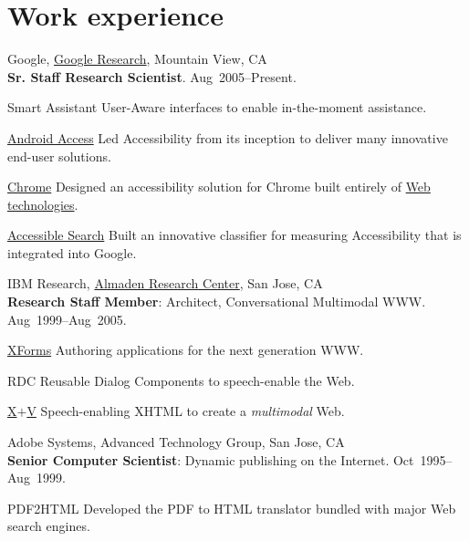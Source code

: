 \documentclass{article}
\begin{document}
\section*{Work experience}
\begin{compactitem}
  \item {Google},
  \href{http://www.google.com/search?q=\%22tv+raman\%22}{Google Research}, Mountain View, CA\\
  \textbf{Sr. Staff Research Scientist}.
\hfill Aug~2005--Present.
\begin{compactdesc}
  \item [Smart Assistant] User-Aware interfaces to enable
in-the-moment  assistance.
\item[\href{http://eyes-free.blogspot.com}{Android Access}]  Led  Accessibility from its
inception to deliver many innovative end-user solutions.
\item[\href{http://chromevox.blogspot.com}{Chrome}]
  Designed   an   accessibility
solution for Chrome  built entirely of 
\href{http://videosrv14.cs.washington.edu/info/audio/mp3/colloq/TRaman_071004.mp3}{Web technologies}.
\item[\href{https://www.youtube.com/watch?v=SIDJnLiizio}{Accessible Search}] Built an innovative classifier for
  measuring  Accessibility  that is integrated into Google.
\end{compactdesc}

\item {IBM Research},
\href{http://www.google.com/search?q=tv+raman+IBM+Almaden}{Almaden Research Center}, San Jose, CA\\
  \textbf{Research Staff Member}: Architect, Conversational
  Multimodal WWW\@. \hfill Aug~1999--Aug~2005.
\begin{compactdesc}
\item [\href{http://www.amazon.com/XForms-XML-Powered-Web-Forms/dp/0321154991}{XForms}] Authoring applications for the next generation
  WWW.\@
\item [RDC] Reusable Dialog Components to speech-enable the Web.

\item [\href{http://www.w3.org/tr/xml-events}{X$+$V}] Speech-enabling XHTML to create a \emph{multimodal\/}
  Web.
\end{compactdesc}
\item   {Adobe Systems},  {Advanced Technology Group}, San Jose, CA\\
  \textbf{Senior Computer Scientist}: Dynamic publishing on the
  Internet.  \hfill Oct~1995--Aug~1999.
\begin{compactdesc}
\item[PDF2HTML] Developed the PDF to HTML translator bundled with
  major Web search engines.
  

\end{compactdesc}
\end{compactitem}
\end{document}
